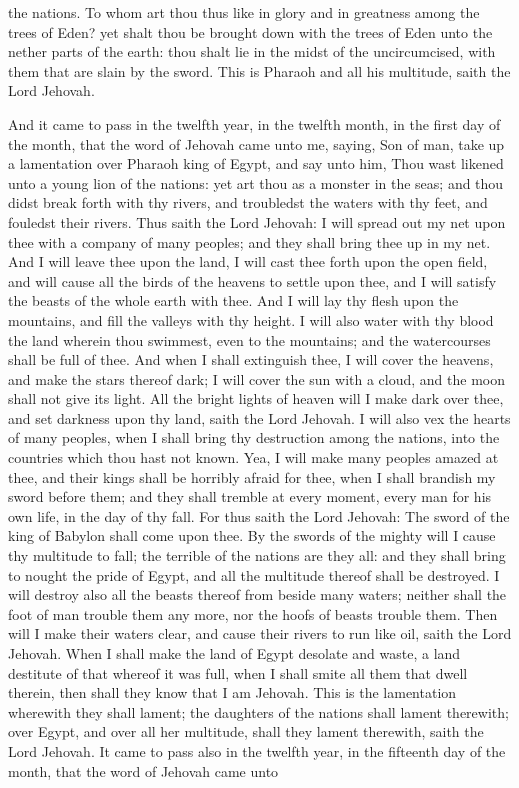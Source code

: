 the nations.  To whom art thou thus like in glory and in greatness among the trees of Eden? yet shalt thou be brought down with the trees of Eden unto the nether parts of the earth: thou shalt lie in the midst of the uncircumcised, with them that are slain by the sword. This is Pharaoh and all his multitude, saith the Lord Jehovah. 

And it came to pass in the twelfth year, in the twelfth month, in the first day of the month, that the word of Jehovah came unto me, saying, Son of man, take up a lamentation over Pharaoh king of Egypt, and say unto him, Thou wast likened unto a young lion of the nations: yet art thou as a monster in the seas; and thou didst break forth with thy rivers, and troubledst the waters with thy feet, and fouledst their rivers. Thus saith the Lord Jehovah: I will spread out my net upon thee with a company of many peoples; and they shall bring thee up in my net. And I will leave thee upon the land, I will cast thee forth upon the open field, and will cause all the birds of the heavens to settle upon thee, and I will satisfy the beasts of the whole earth with thee. And I will lay thy flesh upon the mountains, and fill the valleys with thy height. I will also water with thy blood the land wherein thou swimmest, even to the mountains; and the watercourses shall be full of thee. And when I shall extinguish thee, I will cover the heavens, and make the stars thereof dark; I will cover the sun with a cloud, and the moon shall not give its light. All the bright lights of heaven will I make dark over thee, and set darkness upon thy land, saith the Lord Jehovah. I will also vex the hearts of many peoples, when I shall bring thy destruction among the nations, into the countries which thou hast not known. Yea, I will make many peoples amazed at thee, and their kings shall be horribly afraid for thee, when I shall brandish my sword before them; and they shall tremble at every moment, every man for his own life, in the day of thy fall.  For thus saith the Lord Jehovah: The sword of the king of Babylon shall come upon thee. By the swords of the mighty will I cause thy multitude to fall; the terrible of the nations are they all: and they shall bring to nought the pride of Egypt, and all the multitude thereof shall be destroyed. I will destroy also all the beasts thereof from beside many waters; neither shall the foot of man trouble them any more, nor the hoofs of beasts trouble them. Then will I make their waters clear, and cause their rivers to run like oil, saith the Lord Jehovah. When I shall make the land of Egypt desolate and waste, a land destitute of that whereof it was full, when I shall smite all them that dwell therein, then shall they know that I am Jehovah. This is the lamentation wherewith they shall lament; the daughters of the nations shall lament therewith; over Egypt, and over all her multitude, shall they lament therewith, saith the Lord Jehovah.  It came to pass also in the twelfth year, in the fifteenth day of the month, that the word of Jehovah came unto 
